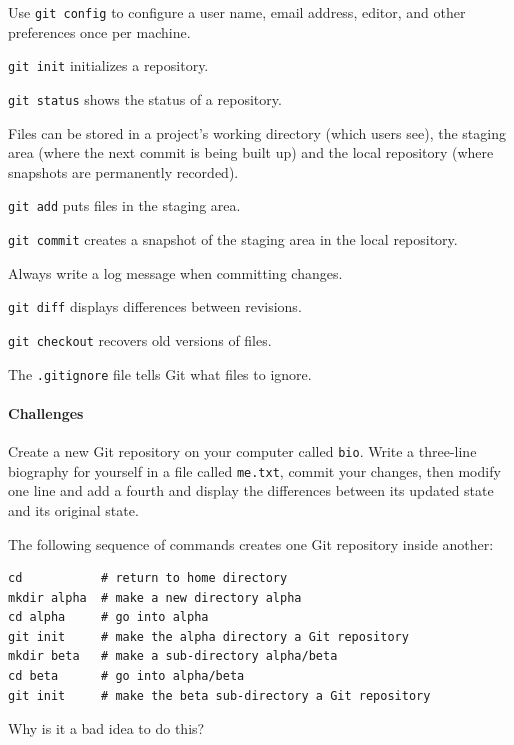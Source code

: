 \documentclass{book}
\begin{document}
\begin{swcitemize}
\item
  Use \texttt{git config} to configure a user name, email address,
  editor, and other preferences once per machine.
\item
  \texttt{git init} initializes a repository.
\item
  \texttt{git status} shows the status of a repository.
\item
  Files can be stored in a project's working directory (which users
  see), the staging area (where the next commit is being built up) and
  the local repository (where snapshots are permanently recorded).
\item
  \texttt{git add} puts files in the staging area.
\item
  \texttt{git commit} creates a snapshot of the staging area in the
  local repository.
\item
  Always write a log message when committing changes.
\item
  \texttt{git diff} displays differences between revisions.
\item
  \texttt{git checkout} recovers old versions of files.
\item
  The \texttt{.gitignore} file tells Git what files to ignore.
\end{swcitemize}

\mbox{}\paragraph{Challenges}

\begin{swcenumerate}
\item
  Create a new Git repository on your computer called \texttt{bio}.
  Write a three-line biography for yourself in a file called
  \texttt{me.txt}, commit your changes, then modify one line and add a
  fourth and display the differences between its updated state and its
  original state.
\item
  The following sequence of commands creates one Git repository inside
  another:

\begin{verbatim}
cd           # return to home directory
mkdir alpha  # make a new directory alpha
cd alpha     # go into alpha
git init     # make the alpha directory a Git repository
mkdir beta   # make a sub-directory alpha/beta
cd beta      # go into alpha/beta
git init     # make the beta sub-directory a Git repository
\end{verbatim}

  Why is it a bad idea to do this?
\end{swcenumerate}
\end{document}

